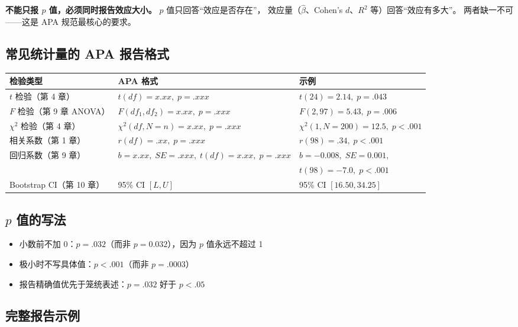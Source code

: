 \textbf{不能只报 $p$ 值，必须同时报告效应大小。} $p$ 值只回答“效应是否存在”，
效应量（$\hat{\beta}$、Cohen's $d$、$R^2$ 等）回答“效应有多大”。
两者缺一不可——这是 APA 规范最核心的要求。

\subsection{常见统计量的 APA 报告格式}

\begin{center}
\renewcommand{\arraystretch}{1.3}
\small
\begin{tabular}{p{2.8cm}p{5.5cm}p{4.7cm}}
\toprule
\textbf{检验类型} & \textbf{APA 格式} & \textbf{示例} \\
\midrule
$t$ 检验（第 4 章） & $t(df) = x.xx,\; p = .xxx$ & $t(24) = 2.14,\; p = .043$ \\
$F$ 检验（第 9 章 ANOVA） & $F(df_1, df_2) = x.xx,\; p = .xxx$ & $F(2, 97) = 5.43,\; p = .006$ \\
$\chi^2$ 检验（第 4 章） & $\chi^2(df, N = n) = x.xx,\; p = .xxx$ & $\chi^2(1, N = 200) = 12.5,\; p < .001$ \\
相关系数（第 1 章） & $r(df) = .xx,\; p = .xxx$ & $r(98) = .34,\; p < .001$ \\
回归系数（第 9 章） & $b = x.xx,\; SE = .xxx,\; t(df) = x.xx,\; p = .xxx$ & $b = -0.008,\; SE = 0.001,$ \\
                     & & $t(98) = -7.0,\; p < .001$ \\
Bootstrap CI（第 10 章） & 95\% CI $[L, U]$ & 95\% CI $[16.50, 34.25]$ \\
\bottomrule
\end{tabular}
\end{center}

\subsection{$p$ 值的写法}

\begin{itemize}
    \item 小数前不加 0：$p = .032$（而非 $p = 0.032$），因为 $p$ 值永远不超过 1
    \item 极小时不写具体值：$p < .001$（而非 $p = .0003$）
    \item 报告精确值优先于笼统表述：$p = .032$ 好于 $p < .05$
\end{itemize}

\subsection{完整报告示例}

